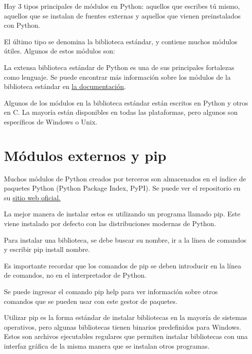 \documentclass{report}
\begin{document}
Hay 3 tipos principales de módulos en Python: aquellos que escribes tú mismo, aquellos que se instalan de fuentes externas y aquellos que vienen preinstalados con Python.

El último tipo se denomina la biblioteca estándar, y contiene muchos módulos útiles. Algunos de estos módulos son:


La extensa biblioteca estándar de Python es una de sus principales fortalezas como lenguaje. Se puede encontrar más información sobre los módulos de la biblioteca estándar en \href{https://docs.python.org/3/library/index.html}{\underline{la documentación}}.

Algunos de los módulos en la biblioteca estándar están escritos en Python y otros en C. La mayoría están disponibles en todas las plataformas, pero algunos son específicos de Windows o Unix.

\section{Módulos externos y pip}

Muchos módulos de Python creados por terceros son almacenados en el índice de paquetes Python (Python Package Index, PyPI). Se puede ver el repositorio en su \href{https://pypi.org}{\underline{sitio web oficial.}}

La mejor manera de instalar estos es utilizando un programa llamado pip. Este viene instalado por defecto con las distribuciones modernas de Python.

Para instalar una biblioteca, se debe buscar su nombre, ir a la línea de comandos y escribir pip install nombre.


Es importante recordar que los comandos de pip se deben introducir en la línea de comandos, no en el interpretador de Python.

Se puede ingresar el comando pip help para ver información sobre otros comandos que se pueden usar con este gestor de paquetes.


Utilizar pip es la forma estándar de instalar bibliotecas en la mayoría de sistemas operativos, pero algunas bibliotecas tienen binarios predefinidos para Windows. Estos son archivos ejecutables regulares que permiten instalar bibliotecas con una interfaz gráfica de la misma manera que se instalan otros programas.
\end{document}
